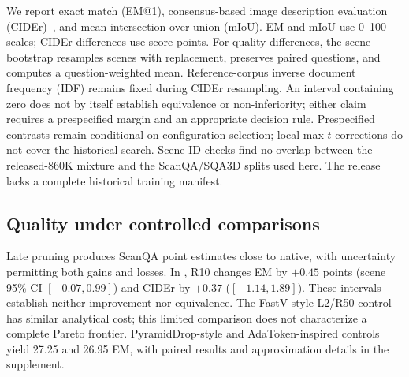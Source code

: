 We report exact match (EM@1), consensus-based image description evaluation (CIDEr)~\cite{vedantam2015cider}, and mean intersection over union (mIoU). EM and mIoU use 0--100 scales; CIDEr differences use score points. For quality differences, the scene bootstrap resamples scenes with replacement, preserves paired questions, and computes a question-weighted mean. Reference-corpus inverse document frequency (IDF) remains fixed during CIDEr resampling. An interval containing zero does not by itself establish equivalence or non-inferiority; either claim requires a prespecified margin and an appropriate decision rule. Prespecified contrasts remain conditional on configuration selection; local max-$t$ corrections do not cover the historical search. Scene-ID checks find no overlap between the released-860K mixture and the ScanQA/SQA3D splits used here. The release lacks a complete historical training manifest.

\subsection{Quality under controlled comparisons}
\begin{table}[t]
\centering
\caption{\textbf{LLaVA-3D ScanQA validation schedule grid.} All 4675 questions are evaluated; GeoGate uses L14/R10. KV and FLOPs estimate LM cost, not total memory or latency.}
\label{tab:scanqa}
\end{table}

Late pruning produces ScanQA point estimates close to native, with uncertainty permitting both gains and losses. In , R10 changes EM by $+0.45$ points (scene 95\% CI $[-0.07,0.99]$) and CIDEr by $+0.37$ ($[-1.14,1.89]$). These intervals establish neither improvement nor equivalence. The FastV-style L2/R50 control has similar analytical cost; this limited comparison does not characterize a complete Pareto frontier. PyramidDrop-style and AdaToken-inspired controls yield 27.25 and 26.95 EM, with paired results and approximation details in the supplement.

